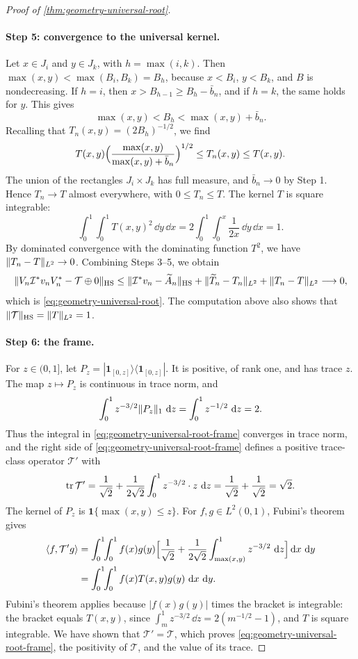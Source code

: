 \begin{proof}[Proof of \cref{thm:geometry-universal-root}]
\paragraph{Step 5: convergence to the universal kernel.}
Let $x\in J_i$ and $y\in J_k$, with $h=\max(i,k)$. Then $\max(x,y)<\max(B_i,B_k)=B_h$, because $x<B_i$, $y<B_k$, and $B$ is nondecreasing. If $h=i$, then $x>B_{h-1}\ge B_h-\bar b_n$, and if $h=k$, the same holds for $y$. This gives
\[
 \max(x,y)<B_h<\max(x,y)+\bar b_n .
\]
Recalling that $T_n(x,y)=(2B_h)^{-1/2}$, we find
\[
 T(x,y)\Bigl(\frac{\max(x,y)}{\max(x,y)+\bar b_n}\Bigr)^{1/2}\le T_n(x,y)\le T(x,y).
\]
The union of the rectangles $J_i\times J_k$ has full measure, and $\bar b_n\to0$ by Step 1. Hence $T_n\to T$ almost everywhere, with $0\le T_n\le T$. The kernel $T$ is square integrable:
\[
 \int_0^1\!\!\int_0^1T(x,y)^2\,\dd y\,\dd x=2\int_0^1\!\!\int_0^x\frac1{2x}\,\dd y\,\dd x=1 .
\]
By dominated convergence with the dominating function $T^2$, we have $\lVert T_n-T\rVert_{L^2}\to0$. Combining Steps 3--5, we obtain
\[
 \lVert V_n\mathcal I^*v_nV_n^*-\mathcal T\oplus0\rVert_{\mathrm{HS}}
 \le\lVert\mathcal I^*v_n-\widetilde A_n\rVert_{\mathrm{HS}}+\lVert\widetilde T_n-T_n\rVert_{L^2}+\lVert T_n-T\rVert_{L^2}\longrightarrow0,
\]
which is \eqref{eq:geometry-universal-root}. The computation above also shows that $\lVert\mathcal T\rVert_{\mathrm{HS}}=\lVert T\rVert_{L^2}=1$.

\paragraph{Step 6: the frame.}
For $z\in(0,1]$, let $P_z=|\mathbf1_{[0,z]}\rangle\langle\mathbf1_{[0,z]}|$. It is positive, of rank one, and has trace $z$. The map $z\mapsto P_z$ is continuous in trace norm, and
\[
 \int_0^1z^{-3/2}\lVert P_z\rVert_1\,\mathop{}\!\mathrm d z=\int_0^1z^{-1/2}\,\mathop{}\!\mathrm d z=2 .
\]
Thus the integral in \eqref{eq:geometry-universal-root-frame} converges in trace norm, and the right side of \eqref{eq:geometry-universal-root-frame} defines a positive trace-class operator $\mathcal T'$ with
\[
 \operatorname{tr}\mathcal T'=\frac1{\sqrt2}+\frac1{2\sqrt2}\int_0^1z^{-3/2}\cdot z\,\mathop{}\!\mathrm d z=\frac1{\sqrt2}+\frac1{\sqrt2}=\sqrt2 .
\]
The kernel of $P_z$ is $\mathbf1\{\max(x,y)\le z\}$. For $f,g\in L^2(0,1)$, Fubini's theorem gives
\begin{align*}
 \ip{f}{\mathcal T'g}
 &=\int_0^1\!\!\int_0^1f(x)g(y)\Bigl[\frac1{\sqrt2}+\frac1{2\sqrt2}\int_{\max(x,y)}^1z^{-3/2}\,\dd z\Bigr]\dd x\,\dd y\\
 &=\int_0^1\!\!\int_0^1f(x)T(x,y)g(y)\,\dd x\,\dd y .
\end{align*}
Fubini's theorem applies because $|f(x)g(y)|$ times the bracket is integrable: the bracket equals $T(x,y)$, since $\int_m^1z^{-3/2}\,\dd z=2(m^{-1/2}-1)$, and $T$ is square integrable. We have shown that $\mathcal T'=\mathcal T$, which proves \eqref{eq:geometry-universal-root-frame}, the positivity of $\mathcal T$, and the value of its trace.
\end{proof}

